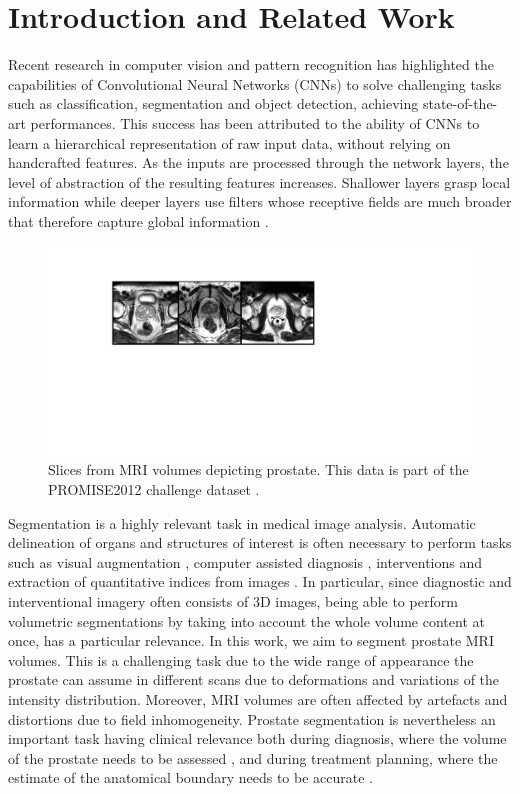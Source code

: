 \section{Introduction and Related Work}
\label{sec:intro}
Recent research in computer vision and pattern recognition has highlighted the capabilities of Convolutional Neural Networks (CNNs) to solve challenging tasks such as classification, segmentation and object detection, achieving state-of-the-art performances. 
This success has been attributed to the ability of CNNs to learn a hierarchical representation of raw input data, without relying on handcrafted features. 
As the inputs are processed through the network layers, the level of abstraction of the resulting features increases. 
Shallower layers grasp local information while deeper layers use filters whose receptive fields are much broader that therefore capture global information \cite{zeiler2014visualizing}. 

\begin{figure} 	
\centering 	
\includegraphics[scale=0.17]{anatomies.pdf} 	
\caption{Slices from MRI volumes depicting prostate. This data is part of the PROMISE2012 challenge dataset \cite{litjens2014evaluation}.} \label{fig:anatomies} 
\end{figure}

Segmentation is a highly relevant task in medical image analysis. 
Automatic delineation of organs and structures of interest is often necessary to perform tasks such as visual augmentation \cite{moradi2009augmenting}, computer assisted diagnosis \cite{porter2003combining}, interventions \cite{zettinig2015multimodal} and extraction of quantitative indices from images \cite{bernard2015standardized}. 
In particular, since diagnostic and interventional imagery often consists of 3D images, being able to perform volumetric segmentations by taking into account the whole volume content at once, has a particular relevance. 
In this work, we aim to segment prostate MRI volumes. This is a challenging task due to the wide range of appearance the prostate can assume in different scans due to deformations and variations of the intensity distribution. Moreover, MRI volumes are often affected by artefacts and distortions due to field inhomogeneity. Prostate segmentation is nevertheless an important task having clinical relevance both during diagnosis, where the volume of the prostate needs to be assessed \cite{roehrborn1999serum}, and during treatment planning, where the estimate of the anatomical boundary needs to be accurate \cite{huyskens2009qualitative,zettinig2015multimodal}. 

